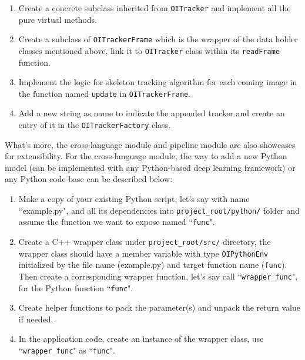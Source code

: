\begin{enumerate}
    \item Create a concrete subclass inherited from \texttt{OITracker} and
    implement all the pure virtual methods.

    \item Create a subclass of \texttt{OITrackerFrame} which is the wrapper of
    the data holder classes mentioned above, link it to \texttt{OITracker} class
    within its \texttt{readFrame} function.

    \item Implement the logic for skeleton tracking algorithm for each coming
    image in the function named    \texttt{update} in \texttt{OITrackerFrame}.

    \item Add a new string as name to indicate the appended tracker and create
    an entry of it in the \texttt{OITrackerFactory} class.
\end{enumerate}

What's more, the cross-language module and pipeline module are also showcases
for extensibility. For the cross-language module, the way to add a new Python
model (can be implemented with any Python-based deep learning framework) or any
Python code-base can be described below:

\begin{enumerate}
    \item Make a copy of your existing Python script, let's say with name
    ``example.py", and all its dependencies into \texttt{project\_root/python/}
    folder and assume the function we want to expose named ``\texttt{func}".
    \item Create a C++ wrapper class under \texttt{project\_root/src/}
    directory, the wrapper class should have a member variable with type
    \texttt{OIPythonEnv} initialized by the file name (example.py) and target
    function name (\texttt{func}). Then create a corresponding wrapper
    function, let's say call ``\texttt{wrapper\_func}", for the Python function
    ``\texttt{func}".
    \item Create helper functions to pack the parameter(s) and unpack the
    return value if needed.
    \item In the application code, create an instance of the wrapper class,
    use ``\texttt{wrapper\_func}" as ``\texttt{func}".
\end{enumerate}

